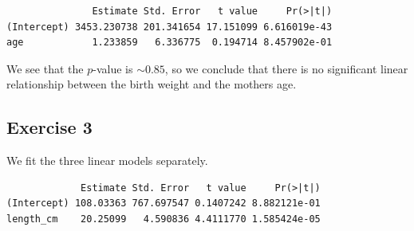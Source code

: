 \documentclass[
  letterpaper,
  DIV=11,
  numbers=noendperiod]{scrreprt}
\newenvironment{Shaded}{\begin{snugshade}}{\end{snugshade}}
\newcommand{\AttributeTok}[1]{\textcolor[rgb]{0.40,0.45,0.13}{#1}}
\newcommand{\CommentTok}[1]{\textcolor[rgb]{0.37,0.37,0.37}{#1}}
\newcommand{\FunctionTok}[1]{\textcolor[rgb]{0.28,0.35,0.67}{#1}}
\newcommand{\NormalTok}[1]{\textcolor[rgb]{0.00,0.23,0.31}{#1}}
\newcommand{\OtherTok}[1]{\textcolor[rgb]{0.00,0.23,0.31}{#1}}
\newcommand{\SpecialCharTok}[1]{\textcolor[rgb]{0.37,0.37,0.37}{#1}}
\begin{document}
\begin{Shaded}
\end{Shaded}

\begin{verbatim}
               Estimate Std. Error   t value     Pr(>|t|)
(Intercept) 3453.230738 201.341654 17.151099 6.616019e-43
age            1.233859   6.336775  0.194714 8.457902e-01
\end{verbatim}

We see that the \(p\)-value is \(\sim0.85\), so we conclude that there
is no significant linear relationship between the birth weight and the
mothers age.

\subsection{Exercise 3}\label{exercise-3-18}

We fit the three linear models separately.

\begin{Shaded}
\end{Shaded}

\begin{verbatim}
             Estimate Std. Error   t value     Pr(>|t|)
(Intercept) 108.03363 767.697547 0.1407242 8.882121e-01
length_cm    20.25099   4.590836 4.4111770 1.585424e-05
\end{verbatim}

\begin{Shaded}
\end{Shaded}
\end{document}
